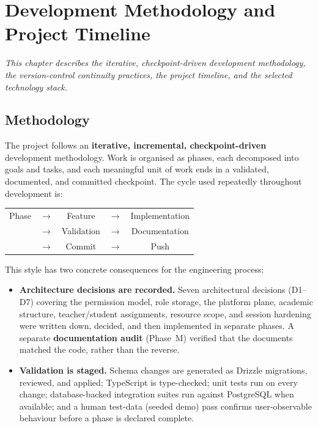 \chapter{Development Methodology and Project Timeline}
\label{ch:methodology}

\begin{center}
\textit{This chapter describes the iterative, checkpoint-driven development
methodology, the version-control continuity practices, the project timeline,
and the selected technology stack.}
\end{center}

\vspace*{\fill}
\clearpage
\section{Methodology}

The project follows an \textbf{iterative, incremental, checkpoint-driven}
development methodology. Work is organised as phases, each decomposed into
goals and tasks, and each meaningful unit of work ends in a validated,
documented, and committed checkpoint. The cycle used repeatedly throughout
development is:

\begin{center}
\small
\begin{tabular}{@{}c@{\qquad}c@{\qquad}c@{\qquad}c@{\qquad}c@{}}
Phase & $\rightarrow$ & Feature & $\rightarrow$ & Implementation \\
& $\rightarrow$ & Validation & $\rightarrow$ & Documentation \\
& $\rightarrow$ & Commit & $\rightarrow$ & Push \\
\end{tabular}
\end{center}

\noindent This style has two concrete consequences for the engineering process:

\begin{itemize}
  \item \textbf{Architecture decisions are recorded.} Seven architectural
  decisions (D1--D7) covering the permission model, role storage, the platform
  plane, academic structure, teacher/student assignments, resource scope, and
  session hardening were written down, decided, and then implemented in
  separate phases. A separate \textbf{documentation audit} (Phase~M) verified
  that the documents matched the code, rather than the reverse.
  \item \textbf{Validation is staged.} Schema changes are generated as
  Drizzle migrations, reviewed, and applied; TypeScript is type-checked; unit
  tests run on every change; database-backed integration suites run against
  PostgreSQL when available; and a human test-data (seeded demo) pass confirms
  user-observable behaviour before a phase is declared complete.
\end{itemize}

